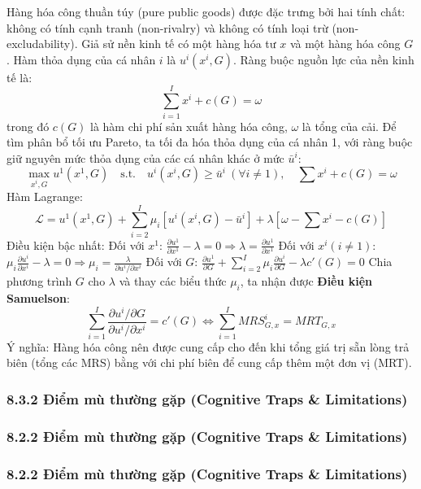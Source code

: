 \documentclass[
]{article}
\begin{document}
Hàng hóa công thuần túy (pure public goods) được đặc trưng bởi hai tính
chất: không có tính cạnh tranh (non-rivalry) và không có tính loại trừ
(non-excludability). Giả sử nền kinh tế có một hàng hóa tư \(x\) và một
hàng hóa công \(G\). Hàm thỏa dụng của cá nhân \(i\) là \(u^i(x^i, G)\).
Ràng buộc nguồn lực của nền kinh tế là:
\[ \sum_{i=1}^I x^i + c(G) = \omega \] trong đó \(c(G)\) là hàm chi phí
sản xuất hàng hóa công, \(\omega\) là tổng của cải. Để tìm phân bổ tối
ưu Pareto, ta tối đa hóa thỏa dụng của cá nhân 1, với ràng buộc giữ
nguyên mức thỏa dụng của các cá nhân khác ở mức \(\bar{u}^i\):
\[ \max_{x^i, G} u^1(x^1, G) \quad \text{s.t.} \quad u^i(x^i, G) \geq \bar{u}^i \ (\forall i \neq 1), \quad \sum x^i + c(G) = \omega \]
Hàm Lagrange:
\[ \mathcal{L} = u^1(x^1, G) + \sum_{i=2}^I \mu_i [u^i(x^i, G) - \bar{u}^i] + \lambda [\omega - \sum x^i - c(G)] \]
Điều kiện bậc nhất: Đối với \(x^1\):
\(\frac{\partial u^1}{\partial x^1} - \lambda = 0 \Rightarrow \lambda = \frac{\partial u^1}{\partial x^1}\)
Đối với \(x^i (i \neq 1)\):
\(\mu_i \frac{\partial u^i}{\partial x^i} - \lambda = 0 \Rightarrow \mu_i = \frac{\lambda}{\partial u^i / \partial x^i}\)
Đối với \(G\):
\(\frac{\partial u^1}{\partial G} + \sum_{i=2}^I \mu_i \frac{\partial u^i}{\partial G} - \lambda c'(G) = 0\)
Chia phương trình \(G\) cho \(\lambda\) và thay các biểu thức \(\mu_i\),
ta nhận được \textbf{Điều kiện Samuelson}:
\[ \sum_{i=1}^I \frac{\partial u^i / \partial G}{\partial u^i / \partial x^i} = c'(G) \iff \sum_{i=1}^I MRS_{G,x}^i = MRT_{G,x} \]
Ý nghĩa: Hàng hóa công nên được cung cấp cho đến khi tổng giá trị sẵn
lòng trả biên (tổng các MRS) bằng với chi phí biên để cung cấp thêm một
đơn vị (MRT).

\subsubsection{8.3.2 Điểm mù thường gặp (Cognitive Traps \&
Limitations)}\label{ux111iux1ec3m-muxf9-thux1b0ux1eddng-gux1eb7p-cognitive-traps-limitations-54}

\subsubsection{8.2.2 Điểm mù thường gặp (Cognitive Traps \&
Limitations)}\label{ux111iux1ec3m-muxf9-thux1b0ux1eddng-gux1eb7p-cognitive-traps-limitations-55}

\subsubsection{8.2.2 Điểm mù thường gặp (Cognitive Traps \&
Limitations)}\label{ux111iux1ec3m-muxf9-thux1b0ux1eddng-gux1eb7p-cognitive-traps-limitations-56}
\end{document}
